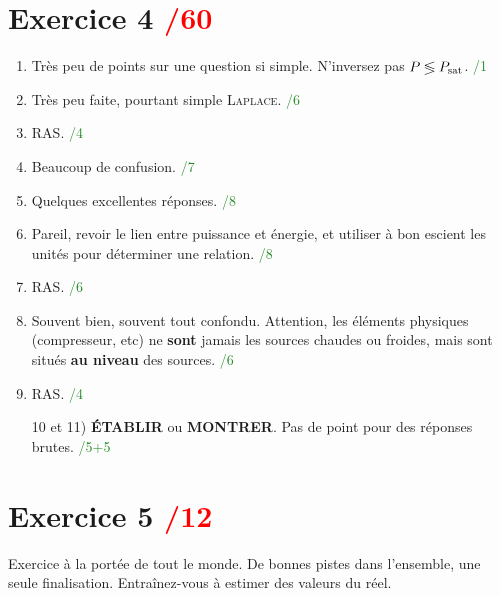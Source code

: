 \documentclass[a4paper, 11pt, final, garamond]{book}
\begin{document}
\section{Exercice 4 \hfill \textcolor{red}{/60}}
\begin{enumerate}
	\item Très peu de points sur une question si simple. N'inversez pas $P
		      \lessgtr P_{\rm sat}$.
	      \hfill \textcolor{ForestGreen}{/1}
	\item Très peu faite, pourtant simple \textsc{Laplace}.
	      \hfill \textcolor{ForestGreen}{/6}
	\item RAS.
	      \hfill \textcolor{ForestGreen}{/4}
	\item Beaucoup de confusion.
	      \hfill \textcolor{ForestGreen}{/7}
	\item Quelques excellentes réponses.
	      \hfill \textcolor{ForestGreen}{/8}
	\item Pareil, revoir le lien entre puissance et énergie, et utiliser à bon
	      escient les unités pour déterminer une relation.
	      \hfill \textcolor{ForestGreen}{/8}
	\item RAS.
	      \hfill \textcolor{ForestGreen}{/6}
	\item Souvent bien, souvent tout confondu. Attention, les éléments physiques
	      (compresseur, etc) ne \textbf{sont} jamais les sources chaudes ou froides,
	      mais sont situés \textbf{au niveau} des sources.
	      \hfill \textcolor{ForestGreen}{/6}
	\item RAS.
	      \hfill \textcolor{ForestGreen}{/4}
	\item[10 et 11)] \textbf{ÉTABLIR} ou \textbf{MONTRER}. Pas de point pour des
		réponses brutes.
		\hfill \textcolor{ForestGreen}{/5+5}
\end{enumerate}

\section{Exercice 5 \hfill \textcolor{red}{/12}}
Exercice à la portée de tout le monde. De bonnes pistes dans l'ensemble, une
seule finalisation. Entraînez-vous à estimer des valeurs du réel.
\end{document}
